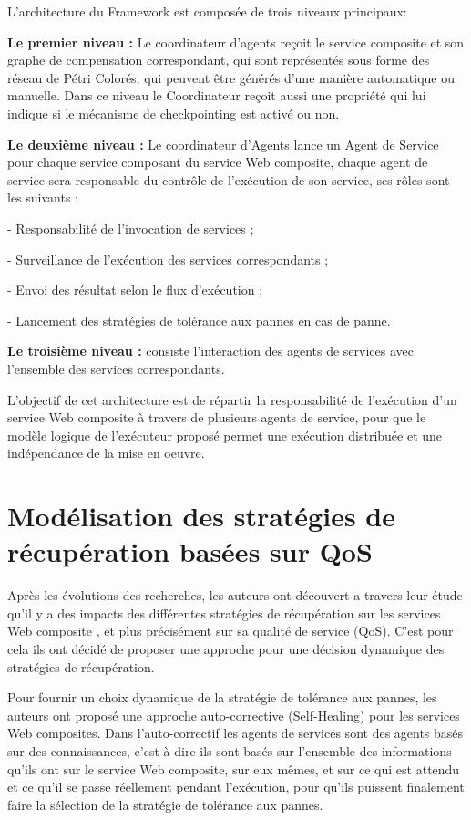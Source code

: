 L’architecture du Framework est composée de trois niveaux principaux:

\textbf{Le premier niveau :}  Le coordinateur d’agents reçoit le service composite et son graphe de compensation correspondant, qui sont représentés sous forme des réseau de Pétri Colorés, qui peuvent être générés d'une manière automatique ou manuelle.
Dans ce niveau le Coordinateur reçoit aussi une propriété qui lui indique si le mécanisme de checkpointing est activé ou non.

\textbf{Le deuxième niveau :} Le coordinateur d'Agents lance un Agent de Service pour chaque service composant du service Web composite, chaque agent de service sera responsable du contrôle de l'exécution de son service, ses rôles sont les suivants \cite{1}:

    - Responsabilité de l'invocation de services ;

    - Surveillance de l'exécution des services correspondants ;
    
    - Envoi des résultat selon le flux d'exécution ;
    
    - Lancement des stratégies de tolérance aux pannes en cas de panne.

\textbf{Le troisième niveau :} consiste l'interaction des agents de services avec l'ensemble des services correspondants.

L'objectif de cet architecture est de répartir la responsabilité de l'exécution d'un service Web composite à travers de plusieurs agents de service, pour que le modèle logique de l'exécuteur proposé permet une exécution distribuée et une indépendance de la mise en oeuvre.

\section{Modélisation des stratégies de récupération basées sur QoS}

Après les évolutions des recherches, les auteurs ont découvert a travers leur étude qu'il y a des impacts des différentes stratégies de récupération sur les services Web composite \cite{4}, et plus précisément sur sa qualité de service (QoS). C'est pour cela ils ont décidé de proposer une approche pour une décision dynamique des stratégies de récupération.

Pour fournir un choix dynamique de la stratégie de tolérance aux pannes, les auteurs ont proposé une approche auto-corrective (Self-Healing) pour les services Web composites.
Dans l'auto-correctif les agents de services sont des agents basés sur des connaissances, c'est à dire ils sont basés sur l'ensemble des informations qu'ils ont sur le service Web composite, sur eux mêmes, et sur ce qui est attendu et ce qu'il se passe réellement pendant l'exécution, pour qu'ils puissent finalement faire la sélection de la stratégie de tolérance aux pannes.

